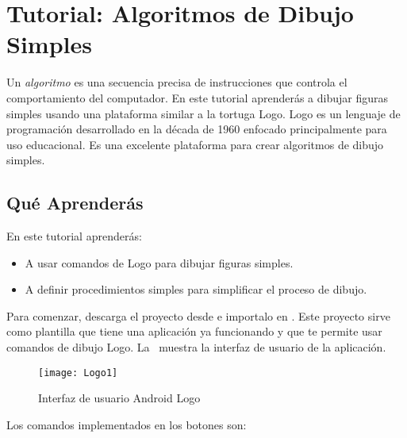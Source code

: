 \section{Tutorial: Algoritmos de Dibujo Simples}

Un \emph{algoritmo} es una secuencia precisa de instrucciones que
controla el comportamiento del computador. En este tutorial aprenderás
a dibujar figuras simples usando una plataforma similar a la tortuga
Logo. Logo es un lenguaje de programación desarrollado en la década de
1960 enfocado principalmente para uso educacional. Es una excelente
plataforma para crear algoritmos de dibujo simples.

\subsection{Qué Aprenderás}
En este tutorial aprenderás:

\begin{itemize}

\item A usar comandos de Logo para dibujar figuras simples.

\item A definir procedimientos simples para simplificar el proceso de
  dibujo.

\end{itemize}

Para comenzar, descarga el proyecto  desde
 e importalo en \AppInventor. Este
proyecto sirve como plantilla que tiene una aplicación ya funcionando
y que te permite usar comandos de dibujo Logo. La~
muestra la interfaz de usuario de la aplicación.

\begin{figure}[H]
  \centering
  \texttt{[image: Logo1]}
  \caption{Interfaz de usuario Android Logo}
  \label{fig:Logo1}
\end{figure}

Los comandos implementados en los botones son:

